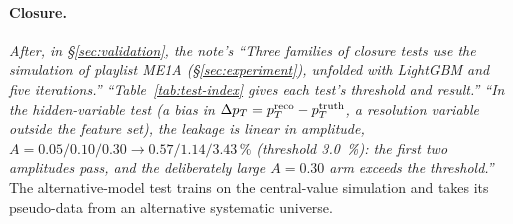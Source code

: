 \paragraph{Closure.} \emph{After, in \S\ref{sec:validation}, the note's ``Three families of closure tests use the simulation of playlist ME1A (\S\ref{sec:experiment}), unfolded with LightGBM and five iterations.'' ``Table~\ref{tab:test-index} gives each test's threshold and result.'' ``In the hidden-variable test (a bias in $\Delta p_{T}=p_{T}^{\mathrm{reco}}-p_{T}^{\mathrm{truth}}$, a resolution variable outside the feature set), the leakage is linear in amplitude, $A=0.05/0.10/0.30\to0.57/1.14/3.43\,\%$ (threshold \SI{3.0}{\percent}): the first two amplitudes pass, and the deliberately large $A=0.30$ arm exceeds the threshold.''} The alternative-model test trains on the central-value simulation and takes its pseudo-data from an alternative systematic universe.

